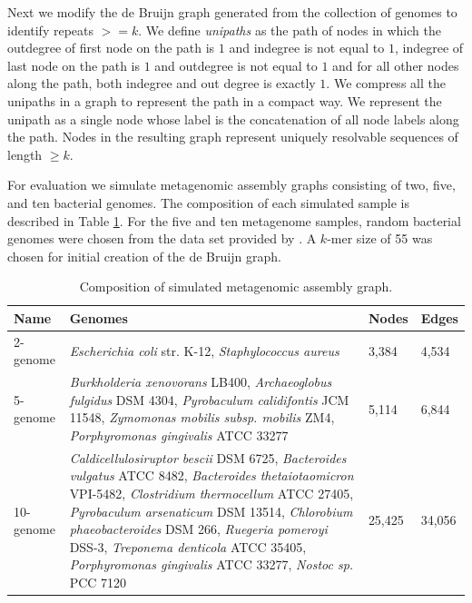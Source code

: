 \documentclass[runningheads,a4paper]{llncs}
\begin{document}
Next we modify the de Bruijn graph generated from the collection of genomes to identify repeats $>=k$. We define \textit{unipaths} as the path of nodes in which the outdegree of first node on the path is $1$ and indegree is not equal to $1$, indegree of last node on the path is $1$ and outdegree is not equal to $1$ and for all other nodes along the path, both indegree and out degree is exactly $1$. We compress all the unipaths in a graph to represent the path in a compact way. We represent the unipath as a single node whose label is the concatenation of all node labels along the path.
Nodes in the resulting graph represent uniquely resolvable sequences of length $\geq k$.

For evaluation we simulate metagenomic assembly graphs consisting of two, five, and ten bacterial genomes.
The composition of each simulated sample is described in Table \ref{tab:composition}.
For the five and ten metagenome samples, random bacterial genomes were chosen from the data set provided by \cite{shakya2013comparative}.
A $k$-mer size of 55 was chosen for initial creation of the de Bruijn graph.

\begin{table}[h]
\centering
\caption[]{Composition of simulated metagenomic assembly graph.}
\begin{tabularx}{\linewidth}{|l|X|l|l|}
\hline
\textbf{Name} & \textbf{Genomes} & \textbf{Nodes} & \textbf{Edges} \\
\hline
2-genome & \textit{Escherichia coli} str. K-12, \textit{Staphylococcus aureus}  & 3,384 & 4,534 \\
\hline
5-genome & \textit{Burkholderia xenovorans} LB400, \textit{Archaeoglobus fulgidus} DSM 4304,  \textit{Pyrobaculum calidifontis} JCM 11548, \textit{Zymomonas mobilis subsp. mobilis} ZM4, \textit{Porphyromonas gingivalis} ATCC 33277 & 5,114 & 6,844  \\
\hline
10-genome  & \textit{Caldicellulosiruptor bescii} DSM 6725, \textit{Bacteroides vulgatus} ATCC 8482,
\textit{Bacteroides thetaiotaomicron} VPI-5482, \textit{Clostridium thermocellum} ATCC 27405,
\textit{Pyrobaculum arsenaticum} DSM 13514, \textit{Chlorobium phaeobacteroides} DSM 266,
\textit{Ruegeria pomeroyi} DSS-3, \textit{Treponema denticola} ATCC 35405,
\textit{Porphyromonas gingivalis} ATCC 33277, \textit{Nostoc sp.} PCC 7120  & 25,425 & 34,056\\
\hline
\end{tabularx}
\label{tab:composition}
\end{table}
\end{document}
